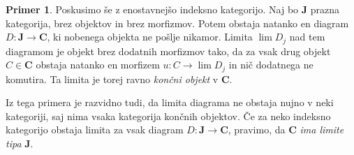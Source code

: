 \documentclass[12pt,a4paper]{book}
\theoremstyle{definition}
\theoremstyle{plain}
\theoremstyle{definition}
\newtheorem{primer}{Primer}[section]
\theoremstyle{remark}
\newcommand{\cat}[1]{\textbf{#1}}
\begin{document}
\begin{primer}
Poskusimo še z enostavnejšo indeksno kategorijo. Naj bo $\cat{J}$ prazna kategorija, brez objektov in brez morfizmov. Potem obstaja natanko en diagram $D : \cat{J} \to \cat{C}$, ki nobenega objekta ne pošlje nikamor. Limita $\lim D_j$ nad tem diagramom je objekt brez dodatnih morfizmov tako, da za vsak drug objekt $C \in \cat{C}$ obstaja natanko en morfizem $u : C \to \lim D_j$ in nič dodatnega ne komutira. Ta limita je torej ravno \emph{končni objekt} v $\cat{C}$.
\end{primer}
Iz tega primera je razvidno tudi, da limita diagrama ne obstaja nujno v neki kategoriji, saj nima vsaka kategorija končnih objektov. Če za neko indeksno kategorijo obstaja limita za vsak diagram $D : \cat{J} \to \cat{C}$, pravimo, da $\cat{C}$ \emph{ima limite tipa} $\cat{J}$.
\end{document}
